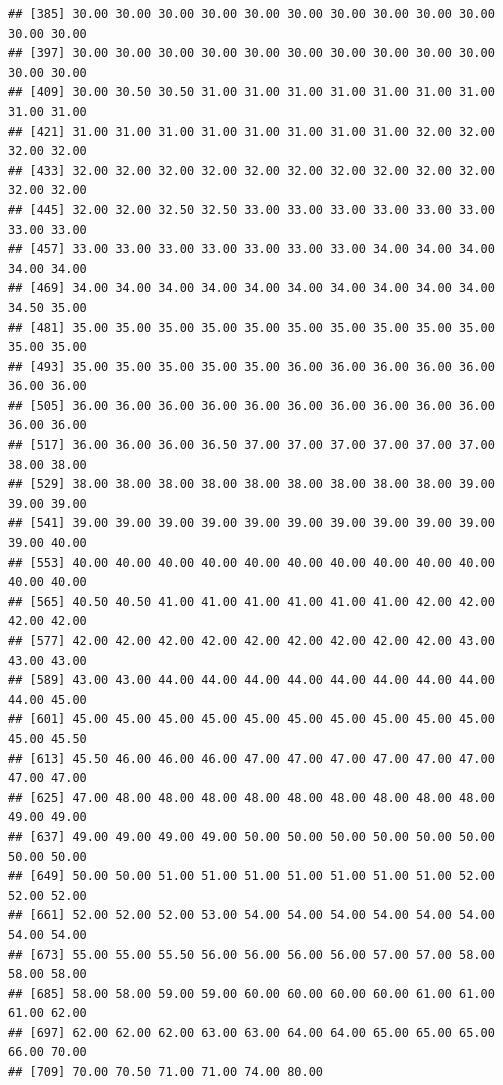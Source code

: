 \documentclass[11pt,]{book}
\newenvironment{Shaded}{\begin{snugshade}}{\end{snugshade}}
\newcommand{\CommentTok}[1]{\textcolor[rgb]{0.37,0.37,0.37}{\textit{#1}}}
\newcommand{\DataTypeTok}[1]{\textcolor[rgb]{0.27,0.27,0.27}{#1}}
\newcommand{\KeywordTok}[1]{\textcolor[rgb]{0.27,0.27,0.27}{\textbf{#1}}}
\newcommand{\NormalTok}[1]{#1}
\newcommand{\OperatorTok}[1]{\textcolor[rgb]{0.43,0.43,0.43}{\textbf{#1}}}
\newcommand{\OtherTok}[1]{\textcolor[rgb]{0.37,0.37,0.37}{#1}}
\begin{document}
\begin{verbatim}
## [385] 30.00 30.00 30.00 30.00 30.00 30.00 30.00 30.00 30.00 30.00 30.00 30.00
## [397] 30.00 30.00 30.00 30.00 30.00 30.00 30.00 30.00 30.00 30.00 30.00 30.00
## [409] 30.00 30.50 30.50 31.00 31.00 31.00 31.00 31.00 31.00 31.00 31.00 31.00
## [421] 31.00 31.00 31.00 31.00 31.00 31.00 31.00 31.00 32.00 32.00 32.00 32.00
## [433] 32.00 32.00 32.00 32.00 32.00 32.00 32.00 32.00 32.00 32.00 32.00 32.00
## [445] 32.00 32.00 32.50 32.50 33.00 33.00 33.00 33.00 33.00 33.00 33.00 33.00
## [457] 33.00 33.00 33.00 33.00 33.00 33.00 33.00 34.00 34.00 34.00 34.00 34.00
## [469] 34.00 34.00 34.00 34.00 34.00 34.00 34.00 34.00 34.00 34.00 34.50 35.00
## [481] 35.00 35.00 35.00 35.00 35.00 35.00 35.00 35.00 35.00 35.00 35.00 35.00
## [493] 35.00 35.00 35.00 35.00 35.00 36.00 36.00 36.00 36.00 36.00 36.00 36.00
## [505] 36.00 36.00 36.00 36.00 36.00 36.00 36.00 36.00 36.00 36.00 36.00 36.00
## [517] 36.00 36.00 36.00 36.50 37.00 37.00 37.00 37.00 37.00 37.00 38.00 38.00
## [529] 38.00 38.00 38.00 38.00 38.00 38.00 38.00 38.00 38.00 39.00 39.00 39.00
## [541] 39.00 39.00 39.00 39.00 39.00 39.00 39.00 39.00 39.00 39.00 39.00 40.00
## [553] 40.00 40.00 40.00 40.00 40.00 40.00 40.00 40.00 40.00 40.00 40.00 40.00
## [565] 40.50 40.50 41.00 41.00 41.00 41.00 41.00 41.00 42.00 42.00 42.00 42.00
## [577] 42.00 42.00 42.00 42.00 42.00 42.00 42.00 42.00 42.00 43.00 43.00 43.00
## [589] 43.00 43.00 44.00 44.00 44.00 44.00 44.00 44.00 44.00 44.00 44.00 45.00
## [601] 45.00 45.00 45.00 45.00 45.00 45.00 45.00 45.00 45.00 45.00 45.00 45.50
## [613] 45.50 46.00 46.00 46.00 47.00 47.00 47.00 47.00 47.00 47.00 47.00 47.00
## [625] 47.00 48.00 48.00 48.00 48.00 48.00 48.00 48.00 48.00 48.00 49.00 49.00
## [637] 49.00 49.00 49.00 49.00 50.00 50.00 50.00 50.00 50.00 50.00 50.00 50.00
## [649] 50.00 50.00 51.00 51.00 51.00 51.00 51.00 51.00 51.00 52.00 52.00 52.00
## [661] 52.00 52.00 52.00 53.00 54.00 54.00 54.00 54.00 54.00 54.00 54.00 54.00
## [673] 55.00 55.00 55.50 56.00 56.00 56.00 56.00 57.00 57.00 58.00 58.00 58.00
## [685] 58.00 58.00 59.00 59.00 60.00 60.00 60.00 60.00 61.00 61.00 61.00 62.00
## [697] 62.00 62.00 62.00 63.00 63.00 64.00 64.00 65.00 65.00 65.00 66.00 70.00
## [709] 70.00 70.50 71.00 71.00 74.00 80.00
\end{verbatim}

\begin{Shaded}
\end{Shaded}
\end{document}
